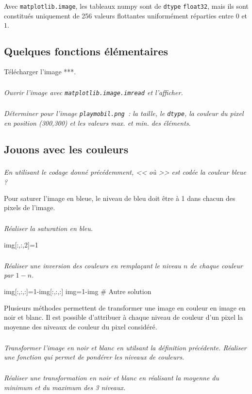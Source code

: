 \documentclass[10pt,fleqn]{article} %
\begin{document}
\begin{multicols}{2}
\begin{remark}
  Avec \texttt{matplotlib.image}, les tableaux numpy sont de
  \texttt{dtype} \texttt{float32}, mais ils sont constitués uniquement
  de 256 valeurs flottantes uniformément réparties entre $0$ et $1$.
\end{remark}


\subsection*{Quelques fonctions élémentaires}
Télécharger l'image ***.
\subparagraph{}\textit{Ouvrir l'image avec \texttt{matplotlib.image.imread} et l'afficher.}


\subparagraph{}\textit{Déterminer pour l'image \texttt{playmobil.png}~: la taille, le
  \texttt{dtype}, la couleur du  pixel en position (300,300) et les
  valeurs max. et min. des éléments.}




\subsection*{Jouons avec les couleurs}
\subparagraph{}\textit{En utilisant le codage donné précédemment, << où >> est codée la couleur bleue ?}

Pour saturer l'image en bleue, le niveau de bleu doit être à 1 dans chacun des pixels de l'image. 

\subparagraph{}\textit{Réaliser la saturation en bleu.}

\begin{python}
img[:,:,2]=1
\end{python}

\subparagraph{}\textit{Réaliser une inversion des couleurs en remplaçant le niveau $n$ de chaque couleur par $1-n$.}
\begin{python}
img[:,:,:]=1-img[:,:,:]
img=1-img # Autre solution
\end{python}

Plusieurs méthodes permettent de transformer une image en couleur en image en noir et blanc. Il est possible d'attribuer à chaque niveau de couleur d'un pixel la moyenne des niveaux de couleur du pixel considéré. 


\subparagraph{}\textit{Transformer l'image en noir et blanc en utilsant la définition précédente. Réaliser une fonction qui permet de pondérer les niveaux de couleurs.}


\subparagraph{}\textit{Réaliser une transformation en noir et blanc en réalisant la moyenne du minimum et du maximum des 3 niveaux.}


\end{multicols}
\end{document}
